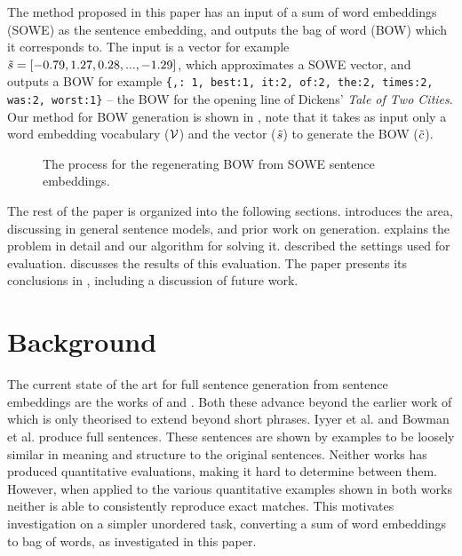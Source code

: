 {The method proposed in this paper has an input of a sum of word embeddings (SOWE) as the sentence embedding, and outputs the bag of word (BOW) which it corresponds to. The input is a vector for example $\tilde{s}=[-0.79, 1.27,0.28,...,-1.29]$, which approximates a SOWE vector, and outputs a BOW for example \texttt{\{\mbox{,: 1}, \mbox{best:1}, \mbox{it:2}, \mbox{of:2}, \mbox{the:2}, \mbox{times:2}, \mbox{was:2}, \mbox{worst:1}\}} -- the BOW for the opening line of Dickens' \emph{Tale of Two Cities}. Our method for BOW generation is shown in , note that it takes as input only a word embedding vocabulary ($\mathcal{V}$) and the vector ($\tilde{s}$) to generate the BOW ($\tilde{c}$). 

\begin{figure}
	\centering 
	
	\caption{The process for the regenerating BOW from SOWE sentence embeddings.}
	\label{block_diagramBG}
\end{figure}

The rest of the paper is organized into the following sections.  introduces the area, discussing in general sentence models, and prior work on generation.  explains the problem in detail and our algorithm for solving it.  described the settings used for evaluation.  discusses the results of this evaluation. The paper presents its conclusions in , including a discussion of future work.


\section{Background}\label{relworkBG}

The current state of the art for full sentence generation from sentence embeddings are the works of \cite{iyyer2014generating} and \cite{Bowman2015SmoothGeneration}. Both these advance beyond the earlier work of \cite{Dinu2014CompositionalGeneration} which is only theorised to extend beyond short phrases. Iyyer et al. and Bowman et al. produce full sentences. These sentences are shown by examples to be loosely similar in meaning and structure to the original sentences. Neither works has produced quantitative evaluations, making it hard to determine between them. However, when applied to the various quantitative examples shown in both works neither is able to consistently reproduce exact matches. This motivates investigation on a simpler unordered task, converting a sum of word embeddings to bag of words, as investigated in this paper.

}
